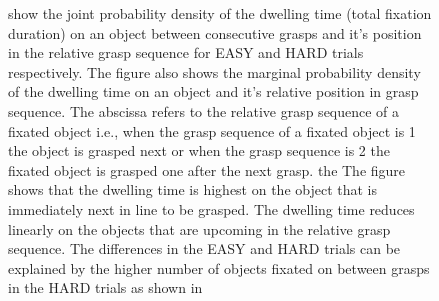 \begin{figure}[h]
{    \protect{}\protect{} show the joint probability density of the dwelling time (total fixation duration) on an object between consecutive grasps and it's position in the relative grasp sequence for EASY and HARD trials respectively. The figure also shows the marginal probability density of the dwelling time  on an object and it's relative position in grasp sequence. The abscissa refers to the relative grasp sequence of a fixated object i.e., when the grasp sequence of a fixated object is 1 the object is grasped next or when the grasp sequence is 2 the fixated object is grasped one after the next grasp.  the The figure shows that the dwelling time is highest on the object that is immediately next in line to be grasped. The dwelling time reduces linearly on the objects that are upcoming in the relative grasp sequence. The differences in the EASY and HARD trials can be explained by the higher number of objects fixated on between grasps in the HARD trials as shown in \protect{}
    }
    \label{figure:planning_behavior}
\end{figure}


